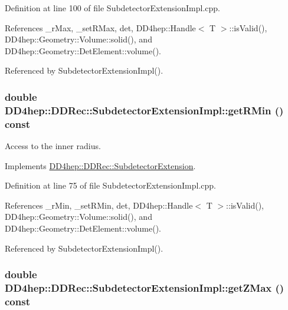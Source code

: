 Definition at line 100 of file SubdetectorExtensionImpl.cpp.

References \_\-rMax, \_\-setRMax, det, DD4hep::Handle$<$ T $>$::isValid(), DD4hep::Geometry::Volume::solid(), and DD4hep::Geometry::DetElement::volume().

Referenced by SubdetectorExtensionImpl().\hypertarget{class_d_d4hep_1_1_d_d_rec_1_1_subdetector_extension_impl_a9d9223f2ac1531aca259385ee8da198d}{
\subsubsection[{getRMin}]{\setlength{\rightskip}{0pt plus 5cm}double DD4hep::DDRec::SubdetectorExtensionImpl::getRMin () const}}
\label{class_d_d4hep_1_1_d_d_rec_1_1_subdetector_extension_impl_a9d9223f2ac1531aca259385ee8da198d}


Access to the inner radius. 

Implements \hyperlink{class_d_d4hep_1_1_d_d_rec_1_1_subdetector_extension_a2de40b96e752aee9d68559657c8b7874}{DD4hep::DDRec::SubdetectorExtension}.

Definition at line 75 of file SubdetectorExtensionImpl.cpp.

References \_\-rMin, \_\-setRMin, det, DD4hep::Handle$<$ T $>$::isValid(), DD4hep::Geometry::Volume::solid(), and DD4hep::Geometry::DetElement::volume().

Referenced by SubdetectorExtensionImpl().\hypertarget{class_d_d4hep_1_1_d_d_rec_1_1_subdetector_extension_impl_aba14e772e28306fd9692a11e1940c51b}{
\subsubsection[{getZMax}]{\setlength{\rightskip}{0pt plus 5cm}double DD4hep::DDRec::SubdetectorExtensionImpl::getZMax () const}}
\label{class_d_d4hep_1_1_d_d_rec_1_1_subdetector_extension_impl_aba14e772e28306fd9692a11e1940c51b}


